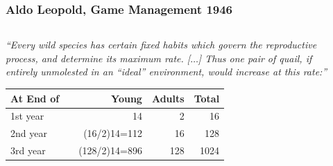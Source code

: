 \documentclass[color=usenames,dvipsnames]{beamer}\usepackage[]{graphicx}\usepackage[]{xcolor}
\begin{document}
\begin{frame}
  \frametitle{\Large Aldo Leopold, Game Management 1946}
  \begin{columns}
    \begin{column}{9cm}
      \small
      \begin{center}
        \it
        ``Every wild species has certain fixed habits which govern the
        reproductive process, and determine its maximum
        rate. [$\dots$] Thus one pair of quail, if entirely unmolested
        in an ``ideal'' environment, would increase at this rate:''
      \end{center}
      \begin{center}
        \scriptsize
          \begin{tabular}{lrrrr}
            \hline
            At End of && Young & Adults & Total \\
            \hline
            1st year  && 14  & 2   & 16  \\
            2nd year  && (16/2)14=112 & 16  & 128 \\
            3rd year  && (128/2)14=896 & 128 & 1024 \\
            \hline
          \end{tabular}
      \end{center}
    \end{column}
    \begin{column}{2cm}
       \\ \vspace{0.5cm}
    \end{column}
  \end{columns}
\end{frame}
\end{document}
